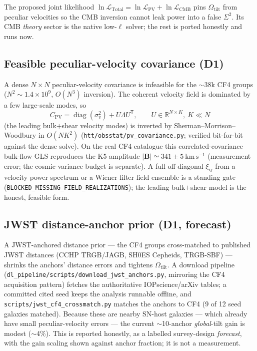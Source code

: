 \documentclass[11pt]{article}
\newcommand{\code}[1]{\texttt{\small #1}}
\newcommand{\Sig}{\Sigma^2}
\newcommand{\Otilt}{\Omega_{\mathrm{tilt}}}
\begin{document}
The proposed joint likelihood
$\ln\mathcal{L}_{\mathrm{Total}}=\ln\mathcal{L}_{\mathrm{PV}}+\ln\mathcal{L}_{\mathrm{CMB}}$
pins $\Otilt$ from peculiar velocities so the CMB inversion cannot leak power
into a false $\Sig$. Its CMB \emph{theory} sector is the native low-$\ell$
solver; the rest is ported honestly and runs now.

\subsection{Feasible peculiar-velocity covariance (D1)}
A dense $N\times N$ peculiar-velocity covariance is infeasible for the
$\sim$38k CF4 groups ($N^2\!\sim\!1.4\times10^9$, $O(N^3)$ inversion). The
coherent velocity field is dominated by a few large-scale modes, so
\begin{equation}
  C_{\mathrm{PV}}=\operatorname{diag}(\sigma_v^2)+U\Lambda U^{\mathsf T},
  \qquad U\in\mathbb{R}^{N\times K},\ K\ll N
\end{equation}
(the leading bulk$+$shear velocity modes) is inverted by
Sherman--Morrison--Woodbury in $O(NK^2)$
(\code{htt/obsstat/pv\_covariance.py}; verified bit-for-bit against the dense
solve). On the real CF4 catalogue this correlated-covariance bulk-flow GLS
reproduces the K5 amplitude $|\mathbf B|\simeq 341\pm 5\ \mathrm{km\,s^{-1}}$
(measurement error; the cosmic-variance budget is separate). A full off-diagonal
$\xi_{ij}$ from a velocity power spectrum or a Wiener-filter field ensemble is a
standing gate (\code{BLOCKED\_MISSING\_FIELD\_REALIZATIONS}); the leading
bulk$+$shear model is the honest, feasible form.

\subsection{JWST distance-anchor prior (D1, forecast)}
A JWST-anchored distance prior --- the CF4 groups cross-matched to published
JWST distances (CCHP TRGB/JAGB, SH0ES Cepheids, TRGB-SBF) --- shrinks the
anchors' distance errors and tightens $\Otilt$. A download pipeline
(\code{dl\_pipeline/scripts/download\_jwst\_anchors.py}, mirroring the CF4
acquisition pattern) fetches the authoritative IOPscience/arXiv tables; a
committed cited seed keeps the analysis runnable offline, and
\code{scripts/jwst\_cf4\_crossmatch.py} matches the anchors to CF4 (9 of 12
seed galaxies matched). Because these are nearby SN-host galaxies --- which
already have small peculiar-velocity errors --- the current
$\sim$10-anchor \emph{global}-tilt gain is modest ($\sim$4\%). This is reported
honestly, as a labelled survey-design \emph{forecast}, with the gain scaling
shown against anchor fraction; it is not a measurement.
\end{document}
